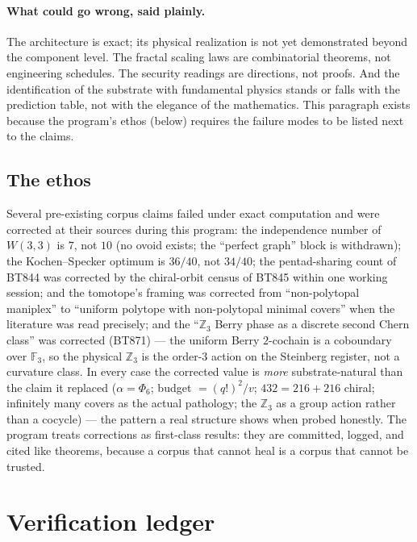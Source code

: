 \documentclass[11pt]{article}
\newcommand{\W}{W(3,3)}
\begin{document}
\paragraph{What could go wrong, said plainly.}  The architecture is
exact; its physical realization is not yet demonstrated beyond the
component level.  The fractal scaling laws are combinatorial
theorems, not engineering schedules.  The security readings are
directions, not proofs.  And the identification of the substrate with
fundamental physics stands or falls with the prediction table, not
with the elegance of the mathematics.  This paragraph exists because
the program's ethos (below) requires the failure modes to be listed
next to the claims.

\subsection{The ethos}

Several pre-existing corpus claims failed under exact computation
and were corrected at their sources during this program: the
independence number of $\W$ is $7$, not $10$ (no ovoid exists; the
``perfect graph'' block is withdrawn); the Kochen--Specker optimum is
$36/40$, not $34/40$; the pentad-sharing count of BT844 was corrected
by the chiral-orbit census of BT845 within one working session; and
the tomotope's framing was corrected from ``non-polytopal maniplex''
to ``uniform polytope with non-polytopal minimal covers'' when the
literature was read precisely; and the ``$\mathbb{Z}_3$ Berry phase
as a discrete second Chern class'' was corrected (BT871) --- the
uniform Berry $2$-cochain is a coboundary over $\mathbb{F}_3$, so the
physical $\mathbb{Z}_3$ is the order-$3$ action on the Steinberg
register, not a curvature class.  In every case the corrected value
is \emph{more} substrate-natural than the claim it replaced
($\alpha=\Phi_6$; budget $=(q!)^2/v$; $432=216+216$ chiral;
infinitely many covers as the actual pathology; the $\mathbb{Z}_3$ as
a group action rather than a cocycle) --- the pattern a
real structure shows when probed honestly.  The program treats
corrections as first-class results: they are committed, logged, and
cited like theorems, because a corpus that cannot heal is a corpus
that cannot be trusted.

\appendix
\section{Verification ledger}
\end{document}
